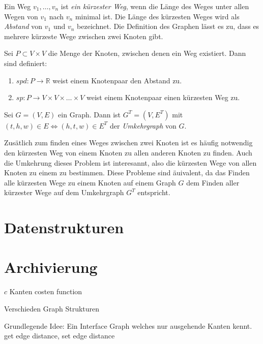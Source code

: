 \begin{definition}
    Ein Weg $v_1, \dotsc, v_n$ ist \emph{ein kürzester Weg}, wenn die Länge des Weges unter allen Wegen von $v_1$ nach $v_n$ minimal ist. Die Länge des kürzesten Weges wird als \emph{Abstand} von $v_1$ und $v_n$ bezeichnet. Die Definition des Graphen lässt es zu, dass es mehrere kürzeste Wege zwischen zwei Knoten gibt.

    Sei $P \subset V \times V$ die Menge der Knoten, zwischen denen ein Weg existiert. Dann sind definiert:
    \begin{enumerate}
        \item
              ${spd} \colon P \to \mathbb{R}$ weist einem Knotenpaar den Abstand zu.

        \item
              ${sp} \colon P \to V \times V \times \dots \times V$ weist einem Knotenpaar einen kürzesten Weg zu.
    \end{enumerate}
\end{definition}

\begin{definition}[Umkehrgraph]
    Sei $G = (V, E)$ ein Graph. Dann ist $G^T = (V, E^T)$ mit $(t, h, w) \in E \Leftrightarrow (h, t, w) \in E^T$ der \emph{Umkehrgraph} von $G$.
\end{definition}

Zusätlich zum finden eines Weges zwischen zwei Knoten ist es häufig notwendig den kürzesten Weg von einem Knoten zu allen anderen Knoten zu finden.
Auch die Umkehrung dieses Problem ist interesannt, also die kürzesten Wege von allen Knoten zu einem zu bestimmen.
Diese Probleme sind äuivalent, da das Finden alle kürzesten Wege zu einem Knoten auf einem Graph $G$ dem Finden aller kürzester Wege auf dem Umkehrgraph $G^T$ entspricht.


\section{Datenstrukturen}

\section{Archivierung}

$c$ Kanten costen function

Verschieden Graph Strukturen

Grundlegende Idee:
Ein Interface Graph welches nur ausgehende Kanten kennt.
get edge distance, set edge distance

